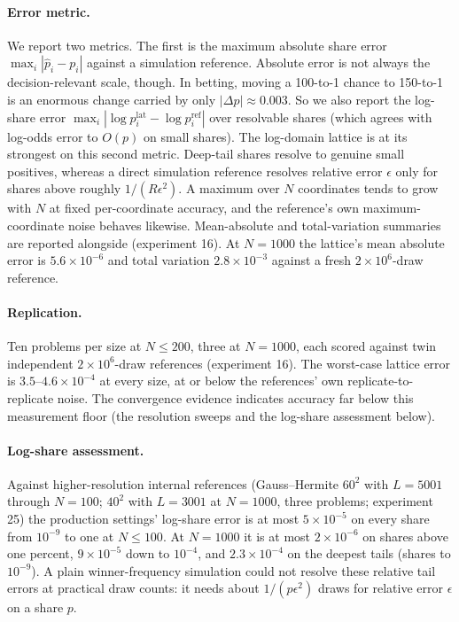 \documentclass[12pt]{article}
\theoremstyle{remark}
\begin{document}
\paragraph{Error metric.} We report two metrics. The first is the
maximum absolute share error $\max_i |\hat p_i - p_i|$ against a
simulation reference. Absolute error is not always the decision-relevant
scale, though. In betting, moving a 100-to-1 chance to 150-to-1 is an
enormous change carried by only $|\Delta p| \approx 0.003$. So we also
report the log-share error $\max_i |\log p^{\mathrm{lat}}_i -
\log p_i^{\mathrm{ref}}|$ over resolvable shares (which agrees with
log-odds error to $O(p)$ on small shares). The log-domain lattice is at
its strongest on this second metric. Deep-tail shares resolve to genuine
small positives, whereas a direct simulation reference resolves relative
error $\epsilon$ only for shares above roughly $1/(R\epsilon^2)$. A maximum over $N$ coordinates tends to grow with $N$ at fixed
per-coordinate accuracy, and the reference's own maximum-coordinate noise
behaves likewise. Mean-absolute and total-variation summaries are
reported alongside (experiment 16). At $N=1000$ the lattice's mean
absolute error is
$5.6\times10^{-6}$ and total variation $2.8\times10^{-3}$ against a fresh
$2\times10^6$-draw reference.

\paragraph{Replication.} Ten problems per size at $N \le 200$, three at
$N=1000$, each scored against twin independent $2\times10^6$-draw
references (experiment 16). The worst-case lattice error is
$3.5$--$4.6\times10^{-4}$ at every size, at or below the references' own
replicate-to-replicate noise. The convergence evidence indicates accuracy far
below this measurement floor (the resolution sweeps and the log-share
assessment below).

\paragraph{Log-share assessment.} Against higher-resolution internal references
(Gauss--Hermite $60^2$ with $L=5001$ through $N=100$; $40^2$ with
$L=3001$ at $N=1000$, three problems; experiment 25) the production
settings' log-share error is at most $5\times10^{-5}$ on every share from
$10^{-9}$ to one at $N \le 100$. At $N=1000$ it is at most
$2\times10^{-6}$ on shares above one percent, $9\times10^{-5}$ down to
$10^{-4}$, and $2.3\times10^{-4}$ on the deepest tails (shares to
$10^{-9}$). A plain winner-frequency simulation could not resolve these
relative tail errors at practical draw counts: it needs about
$1/(p\epsilon^2)$ draws for relative error $\epsilon$ on a share $p$.
\end{document}
